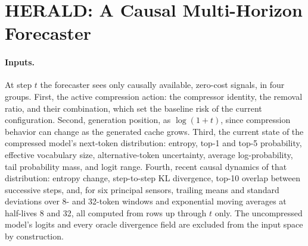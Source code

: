 \section{HERALD: A Causal Multi-Horizon Forecaster}

\label{sec:method}

\paragraph{Inputs.}
At step $t$ the forecaster sees only causally available, zero-cost signals,
in four groups. First, the active compression action: the compressor
identity, the removal ratio, and their combination, which set the baseline
risk of the current configuration. Second, generation position, as
$\log(1 + t)$, since compression behavior can change as the generated cache
grows. Third, the current state of the compressed model's next-token
distribution: entropy, top-1 and top-5 probability, effective vocabulary
size, alternative-token uncertainty, average log-probability, tail
probability mass, and logit range. Fourth, recent causal dynamics of that
distribution: entropy change, step-to-step KL divergence, top-10 overlap
between successive steps, and, for six principal sensors, trailing means and
standard deviations over 8- and 32-token windows and exponential moving
averages at half-lives 8 and 32, all computed from rows up through $t$ only.
The uncompressed model's logits and every oracle divergence field are
excluded from the input space by construction.

